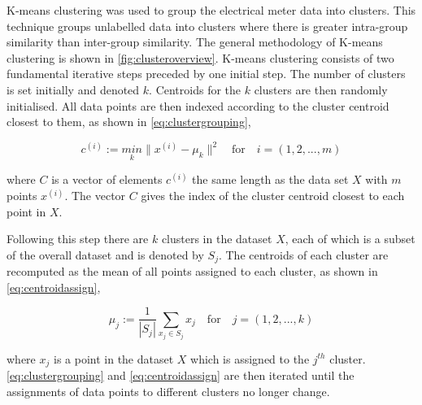 K-means clustering was used to group the electrical meter data into clusters. This technique groups unlabelled data into clusters where there is greater intra-group similarity than inter-group similarity. The general methodology of K-means clustering is shown in \autoref{fig:clusteroverview}. K-means clustering consists of two fundamental iterative steps preceded by one initial step. The number of clusters is set initially and denoted $k$. Centroids for the $k$ clusters are then randomly initialised. All data points are then indexed according to the cluster centroid closest to them, as shown in \autoref{eq:clustergrouping},

\begin{equation}
c^{(i)}  := \underset{k}{min}  \lVert {x^{(i)} - \mu_k} \rVert ^2 \quad \text{for} \quad i = (1, 2, ..., m)
\label{eq:clustergrouping}
\end{equation}

where $C$ is a vector of elements $c^{(i)}$ the same length as the data set $X$ with $m$ points $x^{(i)}$. The vector $C$ gives the index of the cluster centroid closest to each point in $X$.

Following this step there are $k$ clusters in the dataset $X$, each of which is a subset of the overall dataset and is denoted by $S_j$. The centroids of each cluster are recomputed as the mean of all points assigned to each cluster, as shown in \autoref{eq:centroidassign},

\begin{equation}
\mu_j := \frac{1}{|S_j|}\sum_{x_j \in S_j} x_j \quad \text{for} \quad j = (1, 2, ..., k)
\label{eq:centroidassign}
\end{equation}

where $x_j$ is a point in the dataset $X$ which is assigned to the $j^{th}$ cluster. \autoref{eq:clustergrouping} and \autoref{eq:centroidassign} are then iterated until the assignments of data points to different clusters no longer change.

